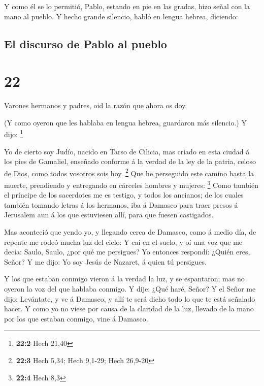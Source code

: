  Y como él se lo permitió, Pablo, estando en pie en las
gradas, hizo señal con la mano al pueblo. Y hecho grande silencio, habló
en lengua hebrea, diciendo:

\hypertarget{el-discurso-de-pablo-al-pueblo}{%
\subsection{El discurso de Pablo al
pueblo}\label{el-discurso-de-pablo-al-pueblo}}

\hypertarget{section-21}{%
\section{22}\label{section-21}}

 Varones hermanos y padres, oid la razón que ahora os doy.

 (Y como oyeron que les hablaba en lengua hebrea, guardaron
más silencio.) Y dijo: \footnote{\textbf{22:2} Hech 21,40}

 Yo de cierto soy Judío, nacido en Tarso de Cilicia, mas
criado en esta ciudad á los pies de Gamaliel, enseñado conforme á la
verdad de la ley de la patria, celoso de Dios, como todos vosotros sois
hoy. \footnote{\textbf{22:3} Hech 5,34; Hech 9,1-29; Hech 26,9-20}
 Que he perseguido este camino hasta la muerte, prendiendo y
entregando en cárceles hombres y mujeres: \footnote{\textbf{22:4} Hech
  8,3}  Como también el príncipe de los sacerdotes me es
testigo, y todos los ancianos; de los cuales también tomando letras á
los hermanos, iba á Damasco para traer presos á Jerusalem aun á los que
estuviesen allí, para que fuesen castigados.

 Mas aconteció que yendo yo, y llegando cerca de Damasco,
como á medio día, de repente me rodeó mucha luz del cielo: 
Y caí en el suelo, y oí una voz que me decía: Saulo, Saulo, ¿por qué me
persigues?  Yo entonces respondí: ¿Quién eres, Señor? Y me
dijo: Yo soy Jesús de Nazaret, á quien tú persigues.

 Y los que estaban conmigo vieron á la verdad la luz, y se
espantaron; mas no oyeron la voz del que hablaba conmigo. 
Y dije: ¿Qué haré, Señor? Y el Señor me dijo: Levántate, y ve á Damasco,
y allí te será dicho todo lo que te está señalado hacer.  Y
como yo no viese por causa de la claridad de la luz, llevado de la mano
por los que estaban conmigo, vine á Damasco.

